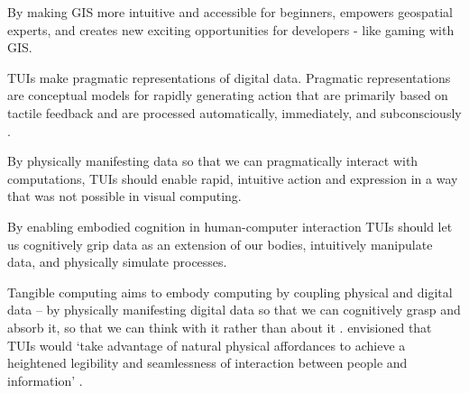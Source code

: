 By making GIS more intuitive and accessible for beginners, empowers geospatial experts, and creates new exciting opportunities for developers - like gaming with GIS. 


TUIs make pragmatic representations of digital data. 
Pragmatic representations are conceptual models for rapidly generating action
that are primarily based on tactile feedback and are processed automatically, immediately, 
and subconsciously \cite{Jeannerod1997}. 
%

By physically manifesting data so that we can pragmatically
interact with computations,  
TUIs should enable rapid, intuitive action and expression 
in a way that was not possible in visual computing. 

By enabling embodied cognition in human-computer interaction 
TUIs should let us cognitively grip data as an extension of our bodies, 
intuitively manipulate data, and physically simulate processes. 

Tangible computing aims to embody computing 
by coupling physical and digital data \cite{Dourish2001} -- 
by physically manifesting digital data so that we can cognitively grasp and absorb it,
so that we can think with it rather than about it \cite{Kirsh2013}. 
\cite{Ishii1997} envisioned that TUIs would  `take advantage of natural physical affordances to achieve a heightened legibility and seamlessness of interaction between people and information' \cite{Ishii1997}. 



